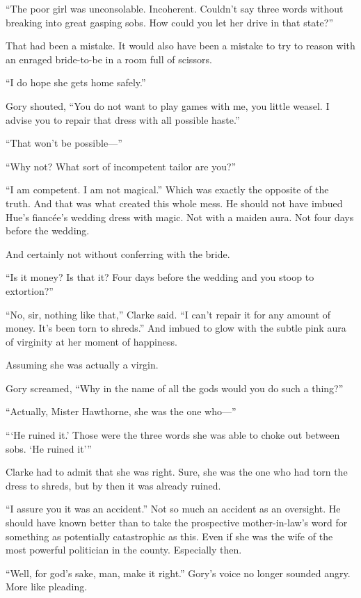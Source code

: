 “The poor girl was unconsolable. Incoherent. Couldn’t say three words
without breaking into great gasping sobs. How could you let her drive in
that state?”

That had been a mistake. It would also have been a mistake to try to
reason with an enraged bride-to-be in a room full of scissors.

“I do hope she gets home safely.”

Gory shouted, “You do not want to play games with me, you little weasel.
I advise you to repair that dress with all possible haste.”

“That won’t be possible—”

“Why not? What sort of incompetent tailor are you?”

“I am competent. I am not magical.” Which was exactly the opposite of
the truth. And that was what created this whole mess. He should not have
imbued Hue’s fiancée’s wedding dress with magic. Not with a maiden aura.
Not four days before the wedding.

And certainly not without conferring with the bride.

“Is it money? Is that it? Four days before the wedding and you stoop to
extortion?”

“No, sir, nothing like that,” Clarke said. “I can’t repair it for any
amount of money. It’s been torn to shreds.” And imbued to glow with the
subtle pink aura of virginity at her moment of happiness.

Assuming she was actually a virgin.

Gory screamed, “Why in the name of all the gods would you do such a
thing?”

“Actually, Mister Hawthorne, she was the one who—”

“‘He ruined it.’ Those were the three words she was able to choke out
between sobs. ‘He ruined it’”

Clarke had to admit that she was right. Sure, she was the one who had
torn the dress to shreds, but by then it was already ruined.

“I assure you it was an accident.” Not so much an accident as an
oversight. He should have known better than to take the prospective
mother-in-law’s word for something as potentially catastrophic as this.
Even if she was the wife of the most powerful politician in the county.
Especially then.

“Well, for god’s sake, man, make it right.” Gory’s voice no longer
sounded angry. More like pleading.

